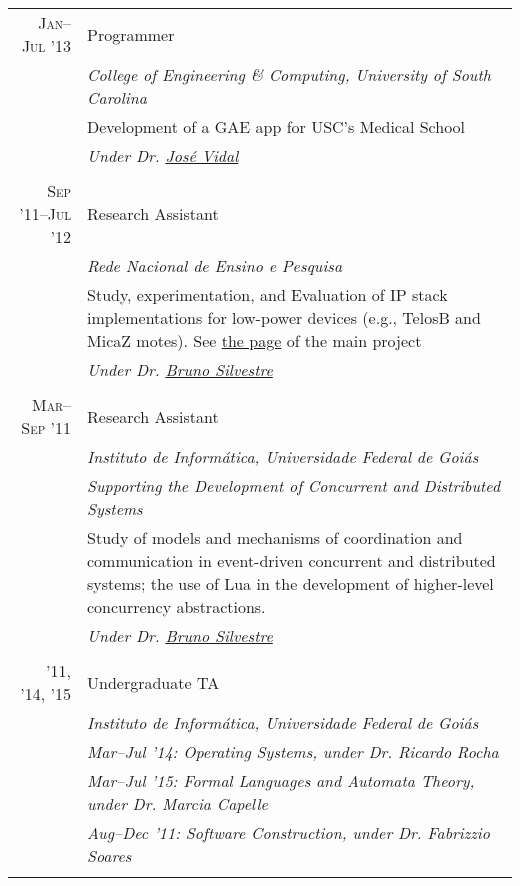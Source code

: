 \documentclass[a4paper,10pt]{article}
\begin{document}
\begin{tabular}{r|p{11cm}}
  \textsc{Jan--Jul '13}
  & Programmer \\
  &\emph{College of Engineering \& Computing, University of South Carolina}\\
  &\footnotesize{Development of a GAE app for USC's Medical School}\\
  &\emph{Under Dr. \href{http://jmvidal.cse.sc.edu}{José Vidal}}
  \\\multicolumn{2}{c}{} \\

  \textsc{Sep '11--Jul '12}
  & Research Assistant \\
  &\emph{Rede Nacional de Ensino e Pesquisa}\\
  &\footnotesize{Study, experimentation, and Evaluation of IP stack implementations 
  for low-power devices (e.g., TelosB and MicaZ motes). See 
            \href{http://www.nr2.ufpr.br/cia2/}{the page} of the main project}\\
  &\emph{Under Dr. \href{http://inf.ufg.br/~brunoos/}{Bruno Silvestre}}
  \\\multicolumn{2}{c}{} \\

  \textsc{Mar--Sep '11}
  & Research Assistant \\
  &\emph{Instituto de Informática, Universidade Federal de Goiás}\\
  &\emph{Supporting the Development of Concurrent and Distributed Systems}\\
  &\indent \footnotesize{Study of models and mechanisms of coordination and 
        communication in event-driven concurrent and distributed systems; the 
        use of Lua in the development of higher-level concurrency abstractions.}\\
  &\emph{Under Dr. \href{http://inf.ufg.br/~brunoos/}{Bruno Silvestre}}
  \\\multicolumn{2}{c}{} \\

  \textsc{'11, '14, '15}
  & Undergraduate TA \\
  &\emph{Instituto de Informática, Universidade Federal de Goiás} \\
  &\emph{Mar--Jul '14: \footnotesize{Operating Systems,
                       under Dr. Ricardo Rocha}} \\
  &\emph{Mar--Jul '15: \footnotesize{Formal Languages and Automata Theory,
                       under Dr. Marcia Capelle}} \\
  &\emph{Aug--Dec '11: \footnotesize{Software Construction,
                       under Dr. Fabrizzio Soares}}
  \\\multicolumn{2}{c}{} \\


\end{tabular}
\end{document}
